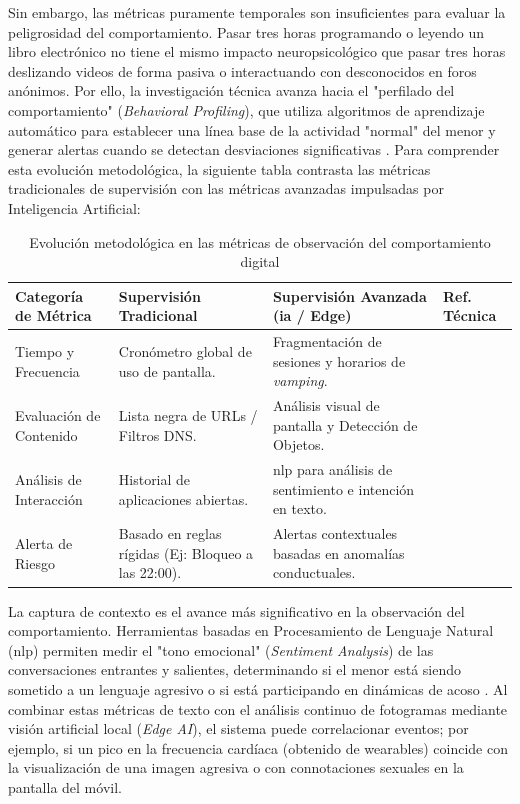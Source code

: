 Sin embargo, las métricas puramente temporales son insuficientes para evaluar la peligrosidad del comportamiento. Pasar tres horas programando o leyendo un libro electrónico no tiene el mismo impacto neuropsicológico que pasar tres horas deslizando videos de forma pasiva o interactuando con desconocidos en foros anónimos. Por ello, la investigación técnica avanza hacia el "perfilado del comportamiento" (\textit{Behavioral Profiling}), que utiliza algoritmos de aprendizaje automático para establecer una línea base de la actividad "normal" del menor y generar alertas cuando se detectan desviaciones significativas \cite{alsoubai_profiling_2024}. Para comprender esta evolución metodológica, la siguiente tabla contrasta las métricas tradicionales de supervisión con las métricas avanzadas impulsadas por Inteligencia Artificial:

\begin{table}[h!]
\centering
\caption{Evolución metodológica en las métricas de observación del comportamiento digital}
\begin{tabular}{|p{3.5cm}|p{4cm}|p{4cm}|p{2cm}|}
\hline
\textbf{Categoría de Métrica} & \textbf{Supervisión Tradicional} & \textbf{Supervisión Avanzada (\gls{ia} / Edge)} & \textbf{Ref. Técnica} \\ \hline
Tiempo y Frecuencia & Cronómetro global de uso de pantalla. & Fragmentación de sesiones y horarios de \textit{vamping}. & \cite{alqahtani_childrens_2023} \\ \hline
Evaluación de Contenido & Lista negra de URLs / Filtros DNS. & Análisis visual de pantalla y Detección de Objetos. & \cite{rojas_technical_2025} \\ \hline
Análisis de Interacción & Historial de aplicaciones abiertas. & \gls{nlp} para análisis de sentimiento e intención en texto. & \cite{razi_sliding_2023} \\ \hline
Alerta de Riesgo & Basado en reglas rígidas (Ej: Bloqueo a las 22:00). & Alertas contextuales basadas en anomalías conductuales. & \cite{alsoubai_profiling_2024} \\ \hline
\end{tabular}
\end{table}

La captura de contexto es el avance más significativo en la observación del comportamiento. Herramientas basadas en Procesamiento de Lenguaje Natural (\gls{nlp}) permiten medir el "tono emocional" (\textit{Sentiment Analysis}) de las conversaciones entrantes y salientes, determinando si el menor está siendo sometido a un lenguaje agresivo o si está participando en dinámicas de acoso \cite{razi_sliding_2023}. Al combinar estas métricas de texto con el análisis continuo de fotogramas mediante visión artificial local (\textit{Edge AI}), el sistema puede correlacionar eventos; por ejemplo, si un pico en la frecuencia cardíaca (obtenido de wearables) coincide con la visualización de una imagen agresiva o con connotaciones sexuales en la pantalla del móvil. \\

